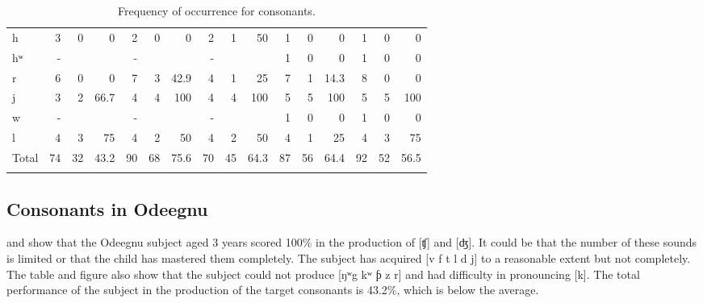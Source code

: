 \documentclass[output=paper,
modfonts
]{langscibook}
\begin{document}
\begin{sidewaystable}
\begin{tabular}{l *{15}{d{1}} }
h & 3 & 0 & 0 & 2 & 0 & 0 & 2 & 1 & 50 & 1 & 0 & 0 & 1 & 0              & 0\\
hʷ & - &  &  & - &  &  & - &  &  & 1 & 0 & 0 & 1 & 0                    & 0\\
r & 6 & 0 & 0 & 7 & 3 & 42.9 & 4 & 1 & 25 & 7 & 1 & 14.3 & 8 & 0        & 0\\
j & 3 & 2 & 66.7 & 4 & 4 & 100 & 4 & 4 & 100 & 5 & 5 & 100 & 5 & 5      & 100\\
w & - &  &  & - &  &  & - &  &  & 1 & 0 & 0 & 1 & 0                     & 0\\
l & 4 & 3 & 75 & 4 & 2 & 50 & 4 & 2 & 50 & 4 & 1 & 25 & 4 & 3           & 75\\
\midrule 
Total & 74 & 32 & 43.2 & 90 & 68 & 75.6 & 70 & 45 & 64.3 & 87 & 56 & 64.4 & 92 & 52 & 56.5\\
\lspbottomrule
\end{tabular}
\caption{Frequency of occurrence for consonants.}
\label{tab:alerechi:17}
\end{sidewaystable}

\subsection{Consonants in Odeegnu}\label{sec:alerechi:2.2}

 and  show that the Odeegnu subject aged 3 years scored 100\% in the production of [ʧ] and [ʤ]. It could be that the number of these sounds is limited or that the child has mastered them completely. The subject has acquired [v f t l d j] to a reasonable extent but not completely. The table and figure also show that the subject could not produce [ŋʷg kʷ ƥ z r] and had difficulty in pronouncing [k]. The total performance of the subject in the production of the target consonants is 43.2\%, which is below the average.
\end{document}
